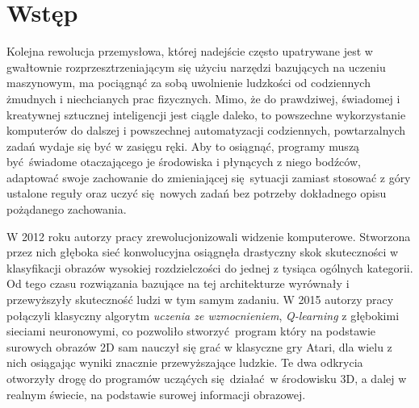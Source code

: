 \chapter{Wstęp}

Kolejna rewolucja przemysłowa, której nadejście często upatrywane jest w gwałtownie rozprzesztrzeniającym się użyciu narzędzi bazujących na uczeniu maszynowym, ma pociągnąć za sobą uwolnienie ludzkości od codziennych żmudnych i niechcianych prac fizycznych. Mimo, że do prawdziwej, świadomej i kreatywnej sztucznej inteligencji jest ciągle daleko, to powszechne wykorzystanie komputerów do dalszej i powszechnej automatyzacji codziennych, powtarzalnych zadań wydaje się być w zasięgu ręki. Aby to osiągnąć, programy muszą być świadome otaczającego je środowiska i płynących z niego bodźców, adaptować swoje zachowanie do zmieniającej się sytuacji zamiast stosować z góry ustalone reguły oraz uczyć się nowych zadań bez potrzeby dokładnego opisu pożądanego zachowania. 

W 2012 roku autorzy pracy \cite{NIPS2012_4824} zrewolucjonizowali widzenie komputerowe. Stworzona przez nich głęboka sieć konwolucyjna osiągnęła drastyczny skok skuteczności w klasyfikacji obrazów wysokiej rozdzielczości do jednej z tysiąca ogólnych kategorii. Od tego czasu rozwiązania bazujące na tej architekturze wyrównały i przewyższyły skuteczność ludzi w tym samym zadaniu. W 2015 autorzy pracy \cite{mnih2015human} połączyli klasyczny algorytm \textit{uczenia ze wzmocnieniem}, \textit{Q-learning} z głębokimi sieciami neuronowymi, co pozwoliło stworzyć program który na podstawie surowych obrazów 2D sam nauczył się grać w klasyczne gry Atari, dla wielu z nich osiągając wyniki znacznie przewyższające ludzkie. Te dwa odkrycia otworzyły drogę do programów ucząćych się działać w środowisku 3D, a dalej w realnym świecie, na podstawie surowej informacji obrazowej.

